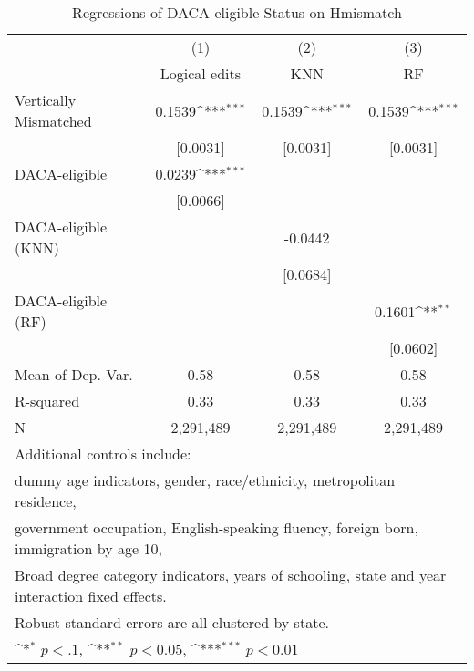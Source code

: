\begin{table}[htbp]\centering
\def\sym#1{\ifmmode^{#1}\else\(^{#1}\)\fi}
\caption{Regressions of DACA-eligible Status on Hmismatch}
\begin{tabular}{l*{3}{c}}
\toprule
                    &\multicolumn{1}{c}{(1)}         &\multicolumn{1}{c}{(2)}         &\multicolumn{1}{c}{(3)}         \\
                    &Logical edits         &         KNN         &          RF         \\
\midrule
Vertically Mismatched&      0.1539\sym{***}&      0.1539\sym{***}&      0.1539\sym{***}\\
                    &    [0.0031]         &    [0.0031]         &    [0.0031]         \\
\addlinespace
DACA-eligible       &      0.0239\sym{***}&                     &                     \\
                    &    [0.0066]         &                     &                     \\
\addlinespace
DACA-eligible (KNN) &                     &     -0.0442         &                     \\
                    &                     &    [0.0684]         &                     \\
\addlinespace
DACA-eligible (RF)  &                     &                     &      0.1601\sym{**} \\
                    &                     &                     &    [0.0602]         \\
\midrule
Mean of Dep. Var.   &        0.58         &        0.58         &        0.58         \\
R-squared           &        0.33         &        0.33         &        0.33         \\
N                   &   2,291,489         &   2,291,489         &   2,291,489         \\
\bottomrule
\multicolumn{4}{l}{\footnotesize Additional controls include:}\\
\multicolumn{4}{l}{\footnotesize dummy age indicators, gender, race/ethnicity, metropolitan residence,}\\
\multicolumn{4}{l}{\footnotesize government occupation, English-speaking fluency, foreign born, immigration by age 10,}\\
\multicolumn{4}{l}{\footnotesize Broad degree category indicators, years of schooling, state and year interaction fixed effects.}\\
\multicolumn{4}{l}{\footnotesize Robust standard errors are all clustered by state.}\\
\multicolumn{4}{l}{\footnotesize \sym{*} \(p<.1\), \sym{**} \(p<0.05\), \sym{***} \(p<0.01\)}\\
\end{tabular}
\end{table}
